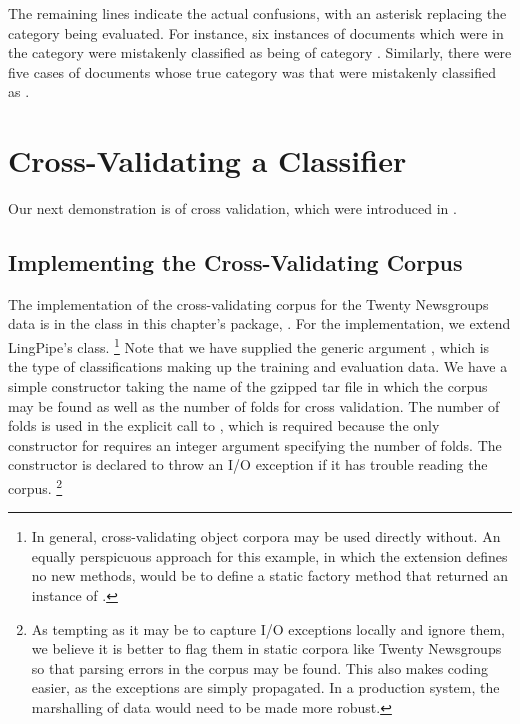 The remaining lines indicate the actual confusions, with an asterisk
replacing the category being evaluated.  For instance, six instances
of documents which were in the 
category were mistakenly classified as being of category
.  Similarly, there were five cases of
documents whose true category was  that were mistakenly
classified as .


\section{Cross-Validating a Classifier}\label{section:naive-bayes-xval}

Our next demonstration is of cross validation, which were introduced in
.  

\subsection{Implementing the Cross-Validating Corpus}

The implementation of the cross-validating corpus for the Twenty
Newsgroups data is in the class  in this
chapter's package, .  For the implementation, we
extend LingPipe's  class.%
%
\footnote{In general, cross-validating object corpora may be used
  directly without. An equally perspicuous approach for this example,
  in which the extension defines no new methods, would be to
  define a static factory method that returned an instance of
  .}
%
%
Note that we have supplied the generic argument
, which is the type of classifications
making up the training and evaluation data.  We have a simple
constructor taking the name of the gzipped tar file in which the
corpus may be found as well as the number of folds for cross
validation.  The number of folds is used in the explicit call to
, which is required because the only constructor for
 requires an integer argument specifying
the number of folds.  The constructor is declared to throw an I/O
exception if it has trouble reading the corpus.%
%
\footnote{As tempting as it may be to capture I/O exceptions locally
  and ignore them, we believe it is better to flag them in static
  corpora like Twenty Newsgroups so that parsing errors in the corpus
  may be found.  This also makes coding easier, as the exceptions are
  simply propagated. In a production system, the marshalling of data
  would need to be made more robust.}

